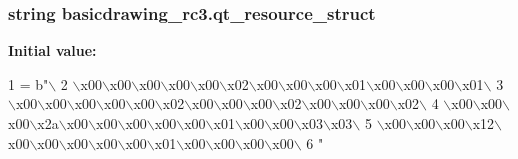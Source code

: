 \subsubsection[{qt\+\_\+resource\+\_\+struct}]{\setlength{\rightskip}{0pt plus 5cm}string basicdrawing\+\_\+rc3.\+qt\+\_\+resource\+\_\+struct}\label{namespacebasicdrawing__rc3_a3cfabe70297998acc2faa89c8b8293e3}
{\bfseries Initial value\+:}
\begin{DoxyCode}
1 = b\textcolor{stringliteral}{"\(\backslash\)}
2 \textcolor{stringliteral}{\(\backslash\)x00\(\backslash\)x00\(\backslash\)x00\(\backslash\)x00\(\backslash\)x00\(\backslash\)x02\(\backslash\)x00\(\backslash\)x00\(\backslash\)x00\(\backslash\)x01\(\backslash\)x00\(\backslash\)x00\(\backslash\)x00\(\backslash\)x01\(\backslash\)}
3 \textcolor{stringliteral}{\(\backslash\)x00\(\backslash\)x00\(\backslash\)x00\(\backslash\)x00\(\backslash\)x00\(\backslash\)x02\(\backslash\)x00\(\backslash\)x00\(\backslash\)x00\(\backslash\)x02\(\backslash\)x00\(\backslash\)x00\(\backslash\)x00\(\backslash\)x02\(\backslash\)}
4 \textcolor{stringliteral}{\(\backslash\)x00\(\backslash\)x00\(\backslash\)x00\(\backslash\)x2a\(\backslash\)x00\(\backslash\)x00\(\backslash\)x00\(\backslash\)x00\(\backslash\)x00\(\backslash\)x01\(\backslash\)x00\(\backslash\)x00\(\backslash\)x03\(\backslash\)x03\(\backslash\)}
5 \textcolor{stringliteral}{\(\backslash\)x00\(\backslash\)x00\(\backslash\)x00\(\backslash\)x12\(\backslash\)x00\(\backslash\)x00\(\backslash\)x00\(\backslash\)x00\(\backslash\)x00\(\backslash\)x01\(\backslash\)x00\(\backslash\)x00\(\backslash\)x00\(\backslash\)x00\(\backslash\)}
6 \textcolor{stringliteral}{"}
\end{DoxyCode}
